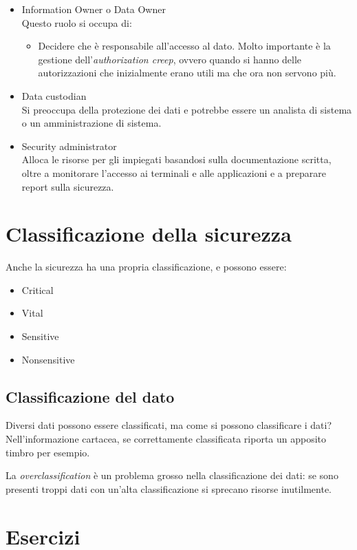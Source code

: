 \begin{itemize}
  \item Information Owner o Data Owner \\
  Questo ruolo si occupa di:
  \begin{itemize}
    \item Decidere che è responsabile all'accesso al dato. Molto importante è 
    la gestione dell'\textit{authorization creep}, ovvero quando si hanno delle 
    autorizzazioni che inizialmente erano utili ma che ora non servono più.
  \end{itemize}
  \item Data custodian \\
  Si preoccupa della protezione dei dati e potrebbe essere un analista di 
  sistema o un amministrazione di sistema.
  \item Security administrator \\
  Alloca le risorse per gli impiegati basandosi sulla documentazione scritta, 
  oltre a monitorare l'accesso ai terminali e alle applicazioni e a preparare 
  report sulla sicurezza.
\end{itemize}

\section{Classificazione della sicurezza}

Anche la sicurezza ha una propria classificazione, e possono essere:
\begin{itemize}
  \item Critical
  \item Vital
  \item Sensitive
  \item Nonsensitive
\end{itemize}

\subsection{Classificazione del dato}

Diversi dati possono essere classificati, ma come si possono classificare i 
dati? Nell'informazione cartacea, se correttamente classificata riporta un 
apposito timbro per esempio.

La \textit{overclassification} è un problema grosso nella classificazione dei 
dati: se sono presenti troppi dati con un'alta classificazione si sprecano 
risorse inutilmente.

\section{Esercizi}

